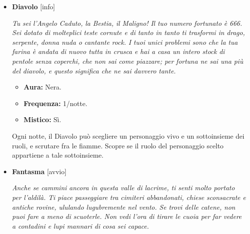 \documentclass[a4paper,10pt]{article}
\begin{document}
\begin{itemize}
            \begin{multicols}{3}
                  \begin{itemize}
                        \item \textbf{Aura:} Nera.
                        \item \textbf{Frequenza:} 1/2 notti.
                        \item \textbf{Mistico:} No.
                  \end{itemize}
            \end{multicols}

            Ogni due notti, l'Avvocato può scegliere un personaggio vivo e far approvare per esso una legge \textit{ad personam}. Se durante il giorno successivo tale personaggio viene condannato al rogo, questi non muore.

      \item \textbf{Diavolo} [info]

            \emph{Tu sei l'Angelo Caduto, la Bestia, il Maligno! Il tuo numero fortunato è 666. Sei dotato di molteplici teste cornute e di tanto in tanto ti trasformi in drago, serpente, donna nuda o cantante rock. I tuoi unici problemi sono che la tua farina è andata di nuovo tutta in crusca e hai a casa un intero stock di pentole senza coperchi, che non sai come piazzare; per fortuna ne sai una più del diavolo, e questo significa che ne sai davvero tante.}

            \begin{multicols}{3}
                  \begin{itemize}
                        \item \textbf{Aura:} Nera.
                        \item \textbf{Frequenza:} 1/notte.
                        \item \textbf{Mistico:} Sì.
                  \end{itemize}
            \end{multicols}

            Ogni notte, il Diavolo può scegliere un personaggio vivo e un sottoinsieme dei ruoli, e scrutare fra le fiamme. Scopre se il ruolo del personaggio scelto appartiene a tale sottoinsieme.

      \item \textbf{Fantasma} [avvio]

            \emph{Anche se cammini ancora in questa valle di lacrime, ti senti molto portato per l'aldilà. Ti piace passeggiare tra cimiteri abbandonati, chiese sconsacrate e antiche rovine, ululando lugubremente nel vento. Se trovi delle catene, non puoi fare a meno di scuoterle. Non vedi l'ora di tirare le cuoia per far vedere a contadini e lupi mannari di cosa sei capace.}


\end{itemize}
\end{document}
